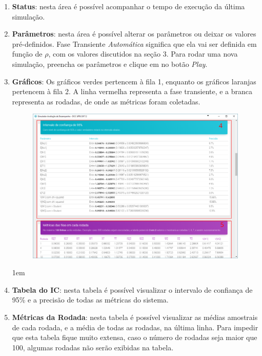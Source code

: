 \documentclass[a4paper,12pt]{report}
\begin{document}
\begin{enumerate}
	\itemsep1em
	\item \textbf{Status}: nesta área é possível acompanhar o tempo de execução da última simulação.
	\item \textbf{Parâmetros}: nesta área é possível alterar os parâmetros ou deixar os valores pré-definidos. Fase Transiente \emph{Automática} significa que ela vai ser definida em função de $\rho$, com os valores discutidos na seção 3. Para rodar uma nova simulação, preencha os parâmetros e clique em no botão \emph{Play}.
	\item \textbf{Gráficos}: Os gráficos verdes pertencem à fila 1, enquanto os gráficos laranjas pertencem à fila 2. A linha vermelha representa a fase transiente, e a branca representa as rodadas, de onde as métricas foram coletadas.

\begin{figure}[H]
\includegraphics[width=1\textwidth]{./graficos/instructions/TablesAD.png}
\vspace{-10mm}
\end{figure}

	\itemsep1em
	\item \textbf{Tabela do IC}: nesta tabela é possível visualizar o intervalo de confiança de 95\% e a precisão de todas as métricas do sistema.
	\item \textbf{Métricas da Rodada}: nesta tabela é possível visualizar as médias amostrais de cada rodada, e a média de todas as rodadas, na última linha. Para impedir que esta tabela fique muito extensa, caso o número de rodadas seja maior que 100, algumas rodadas não serão exibidas na tabela.


\end{enumerate}
\end{document}
